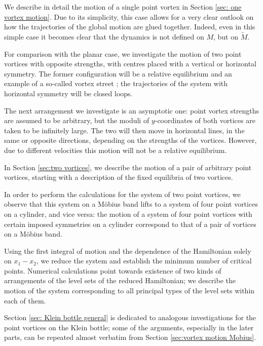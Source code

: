 \documentclass[11pt,twoside]{article}
\theoremstyle{definition}
\numberwithin{equation}{section}
\def\Mt{\widetilde{M}}
\begin{document}
   We describe in detail the motion of a single point vortex in Section \ref{sec: one vortex motion}.  Due to its simplicity, this case allows for a very clear outlook on how the trajectories of the global motion are glued together. Indeed, even in this simple case it becomes clear that the dynamics is not defined on $M$, but on $\Mt$. 
   
      For comparison with the planar case, we investigate the motion of two point vortices with opposite strengths, with centres placed with a vertical or horizontal symmetry. The former configuration will be a relative equilibrium and an example of a so-called vortex street \cite{stremler2014point}; the trajectories of the system with horizontal symmetry will be closed loops. 
   
      The next arrangement we investigate is an asymptotic one: point vortex strengths are assumed to be arbitrary, but the moduli of $y$-coordinates of both vortices are taken to be infinitely large. The two   will then move in horizontal lines, in the same or opposite directions, depending on the strengths of the vortices. However, due to different velocities this motion will not be a relative equilibrium. 
   
   In Section \ref{sec:two vortices}, we describe the motion of a pair of arbitrary point vortices, starting with a description of the fixed equilibria of two vortices. 
   
   In order to perform the calculations for the system of two point vortices, we observe that this system on a M\"obius band lifts to a system of four point vortices on a cylinder, and vice versa: the motion of a system of four point vortices with certain imposed symmetries on a cylinder correspond to that of  a pair of vortices on a M\"obius band. 
   
   Using the first integral of motion and the dependence of the Hamiltonian solely on $x_1-x_2$, we reduce the system and establish the minimum number of critical points. Numerical calculations point towards existence of two  kinds of  arrangements of the level sets of the reduced Hamiltonian; we describe the motion of the system corresponding to all principal types of the level sets within each of them. 

   
   Section \ref{sec: Klein bottle general} is dedicated to analogous investigations for the point vortices on the Klein bottle; some of the arguments, especially in the later parts, can be repeated almost verbatim from Section \ref{sec:vortex motion Mobius}. 
\end{document}
